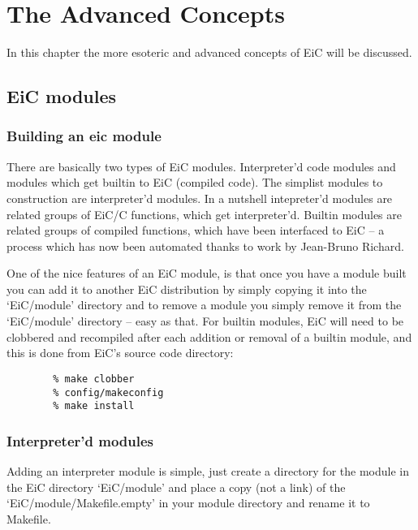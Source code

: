 \chapter{The Advanced Concepts}
\label{chp:Advanced}

In this chapter the more esoteric and advanced concepts of
EiC will be discussed.

\section{EiC modules}
\label{sec:eic_module}

\subsection{Building an eic module}

There are basically two types of EiC modules. Interpreter'd code
modules and modules which get builtin to EiC (compiled code). The
simplist modules to construction are interpreter'd modules. In a
nutshell intepreter'd modules are related groups of EiC/C functions,
which get interpreter'd. Builtin modules are related groups of
compiled functions, which have been interfaced to EiC -- a process
which has now been automated thanks to work by Jean-Bruno Richard.

One of the nice features of an EiC module, is that once you have a
module built you can add it to another EiC distribution by simply
copying it into the `EiC/module' directory and to remove a module you
simply remove it from the `EiC/module' directory -- easy as that. For
builtin modules, EiC will need to be clobbered and recompiled after
each addition or removal of a builtin module, and this is done from
EiC's source code directory:

\small
\begin{verbatim}
        % make clobber
        % config/makeconfig
        % make install
\end{verbatim}
\normalsize

\subsection{Interpreter'd modules}
\label{sec:interpreter_modules}

Adding an interpreter module is simple, just create a directory for
the module in the EiC directory `EiC/module' and place a copy (not a
link) of the `EiC/module/Makefile.empty' in your module directory and
rename it to Makefile.

